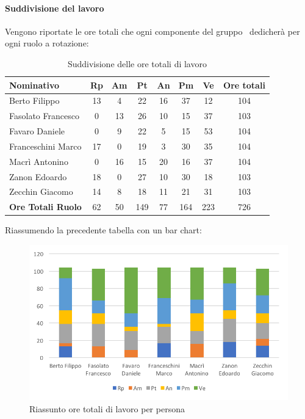 \documentclass[../PianoDiProgetto_v4.0.0.tex]{subfiles}
\begin{document}
			\paragraph{Suddivisione del lavoro}
			Vengono riportate le ore totali che ogni componente del gruppo \kpanic\ dedicherà per ogni ruolo a rotazione:
			\begin{table}[h]
				\begin{tabularx}{\textwidth}{l * {6}{C} c}
				\toprule
				\textbf{Nominativo} & \textbf{Rp} & \textbf{Am} & \textbf{Pt} & \textbf{An} & \textbf{Pm} & \textbf{Ve} & \textbf{Ore totali} \\
				\midrule
				Berto Filippo &	13 & 4 & 22 & 16 & 37 & 12 & 104 \\
				Fasolato Francesco & 0 & 13 & 26 & 10 & 15 & 37 & 103 \\
				Favaro Daniele & 0 & 9 & 22 & 5 & 15 & 53 & 104 \\
				Franceschini Marco & 17 & 0 & 19 & 3 & 30 & 35 & 104 \\
				Macrì Antonino & 0 & 16 & 15 & 20 & 16 & 37 & 104 \\
				Zanon Edoardo &	18 & 0 & 27 & 10 & 30 & 18 & 103 \\
				Zecchin Giacomo & 14 & 8 & 18 & 11 & 21 & 31 & 103 \\
				\midrule			
				\textbf{Ore Totali Ruolo} & 62 & 50 & 149 & 77 & 164 & 223 & 726 \\
				\bottomrule
				\end{tabularx}
				\caption{Suddivisione delle ore totali di lavoro}		
			\end{table}

			Riassumendo la precedente tabella con un bar chart:
			\begin{figure}[!h]
				\centering
				\includegraphics[width=\textwidth]{Preventivo/Immagini/rendicontato_oreRuoloPersona.png}
				\caption{Riassunto ore totali di lavoro per persona}
			\end{figure}	
			
\end{document}
